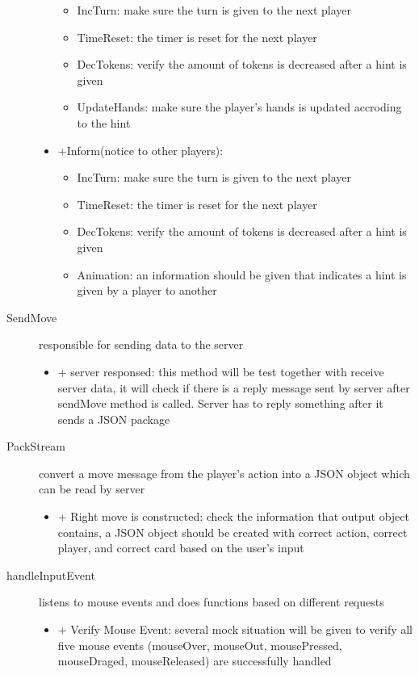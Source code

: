 \documentclass[12pt]{article}
\begin{document}
\begin{description}
\begin{itemize}
			\begin{itemize}
		    	\item IncTurn: make sure the turn is given to the next player
		    	\item TimeReset: the timer is reset for the next player
			\item DecTokens: verify the amount of tokens is decreased after a hint is given
			\item UpdateHands: make sure the player's hands is updated accroding to the hint
    			\end{itemize}
		\item +Inform(notice to other players):
			\begin{itemize}
		    	\item IncTurn: make sure the turn is given to the next player
		    	\item TimeReset: the timer is reset for the next player
			\item DecTokens: verify the amount of tokens is decreased after a hint is given
			\item Animation: an information should be given that indicates a hint is given by a player to another
    			\end{itemize}
	\end{itemize}
	
	\item[SendMove] responsible for sending data to the server
	\begin{itemize}
		\item + server responsed: this method will be test together with receive server data, it will check if there is a reply message sent by server after sendMove method is called. Server has to reply something after it sends a JSON package
	\end{itemize}
	\item[PackStream] convert a move message from the player's action into a JSON object which can be read by server
	\begin{itemize}
		\item + Right move is constructed: check the information that output object contains, a JSON object should be created with correct action, correct player, and correct card based on the user's input
	\end{itemize}
	\item[handleInputEvent] listens to mouse events and does functions based on different requests
	\begin{itemize}
		\item + Verify Mouse Event: several mock situation will be given to verify all five mouse events (mouseOver, mouseOut, mousePressed, mouseDraged, mouseReleased) are successfully handled
	\end{itemize}

	
	
\end{description}
\end{document}
